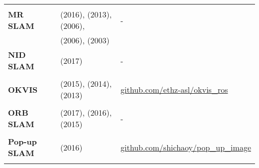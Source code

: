 \documentclass[a4paper,12pt]{scrartcl}
\begin{document}
{\begin{longtable}{l|l|l}
                           &                                                                                             &                                                                       \\ [-3mm]
    \textbf{MR SLAM}       & \cite{Choudhary2016} (2016), \cite{Alexandre2013} (2013), \cite{Zhou2006} (2006),           & -                                                                     \\
                           & \cite{Howard2006} (2006), \cite{Liu2003} (2003)                                             &                                                                       \\
    \textbf{NID SLAM}      & \cite{Pascoe2017} (2017)                                                                    & -                                                                     \\
                           &                                                                                             &                                                                       \\ [-3mm]
    \textbf{OKVIS}         & \cite{Leutenegger2015} (2015), \cite{Leutenegger2014} (2014), \cite{Leutenegger2013} (2013) & {\url{github.com/ethz-asl/okvis_ros}}                                 \\
                           &                                                                                             &                                                                       \\ [-3mm]
    \textbf{ORB SLAM}      & \cite{Mur-Artal2017} (2017), \cite{Mur-Artal2016a} (2016), \cite{Mur-Artal2015} (2015)      & -                                                                     \\
                           &                                                                                             &                                                                       \\ [-3mm]
    \textbf{Pop-up SLAM}   & \cite{Yang2016} (2016)                                                                      & {\url{github.com/shichaoy/pop_up_image}}                              \\
                           &                                                                                             &                                                                       \\ [-3mm]

\end{longtable}}
\end{document}
